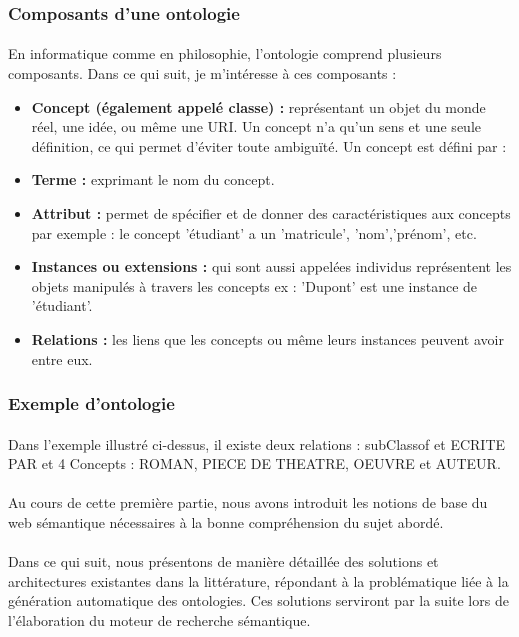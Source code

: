 \documentclass[12pt, a4paper, oneside]{book}
\begin{document}
\subsubsection{Composants d'une ontologie}
\paragraph{}
En informatique comme en philosophie, l'ontologie comprend plusieurs composants. Dans ce qui suit, je m'intéresse à ces composants :
\begin{itemize}
\item \textbf{Concept (également appelé classe) : }représentant un objet du monde réel, une idée, ou même une URI. Un concept n'a qu'un sens et une seule définition, ce qui permet d'éviter toute ambiguïté. Un concept est défini par :
\item \textbf{Terme : }exprimant le nom du concept.
\item \textbf{Attribut : }permet de spécifier et de donner des caractéristiques aux concepts par exemple : le concept 'étudiant' a un 'matricule', 'nom','prénom', etc.
\item \textbf{Instances ou extensions : }qui sont aussi appelées individus représentent les objets manipulés à travers les concepts ex : 'Dupont' est une instance de 'étudiant'.
\item \textbf{Relations : } les liens que les concepts ou même leurs instances peuvent avoir entre eux.
\end{itemize}

\subsubsection{Exemple d'ontologie}
\paragraph{}
Dans l'exemple illustré ci-dessus, il existe deux relations : subClassof et ECRITE PAR et 4 Concepts : ROMAN, PIECE DE THEATRE, OEUVRE et AUTEUR.

\paragraph{}
Au cours de cette première partie, nous avons introduit les notions de base du web sémantique nécessaires à la bonne compréhension du sujet abordé.
\paragraph{}
Dans ce qui suit, nous présentons de manière détaillée des solutions et architectures existantes dans la littérature, répondant à la problématique liée à la génération automatique des ontologies.
Ces solutions serviront par la suite lors de l'élaboration du moteur de recherche sémantique.
\end{document}

